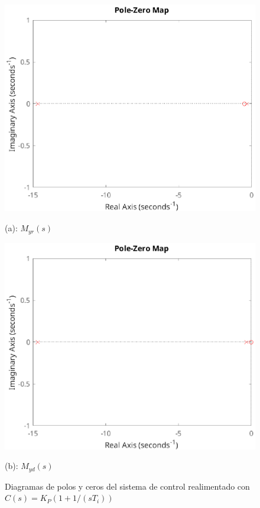\begin{figure}[!h]
    \centering
    \begin{minipage}{0.45\linewidth}
        \includegraphics[width=\linewidth]{figs/fig10.eps}
        \caption*{(a): $M_{yr}(s)$}
    \end{minipage}
    \begin{minipage}{0.45\linewidth}
        \includegraphics[width=\linewidth]{figs/fig11.eps}
        \caption*{(b): $M _{yd}(s)$}
    \end{minipage}
    \caption{Diagramas de polos y ceros del sistema de control realimentado con $C(s) = K_P(1 + 1/(sT_i))$}
    \label{fig7}
\end{figure}

